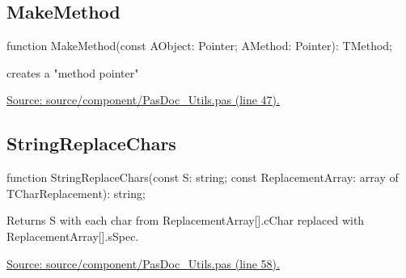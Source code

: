 \documentclass{report}
\newif\ifpdf
\begin{document}
\subsection*{MakeMethod}
\fi
\label{PasDoc_Utils-MakeMethod}
\begin{list}{}{
\setlength{\itemindent}{0cm}
\setlength{\listparindent}{0cm}
\setlength{\leftmargin}{\evensidemargin}
\addtolength{\leftmargin}{\tmplength}
\settowidth{\labelsep}{X}
\addtolength{\leftmargin}{\labelsep}
\setlength{\labelwidth}{\tmplength}
}
\item[\textbf{Declaration}\hfill]
\ifpdf
\begin{flushleft}
\fi
\begin{ttfamily}
function MakeMethod(const AObject: Pointer; AMethod: Pointer): TMethod;\end{ttfamily}

\ifpdf
\end{flushleft}
\fi

\par
\item[\textbf{Description}]
creates a "method pointer"\par
\href{https://github.com/pasdoc/pasdoc/blob/master/source/component/PasDoc_Utils.pas#L47}{Source: source/component/PasDoc{\_}Utils.pas (line 47).}

\end{list}
\ifpdf
\subsection*{\large{\textbf{StringReplaceChars}}\normalsize\hspace{1ex}\hrulefill}
\else
\subsection*{StringReplaceChars}
\fi
\label{PasDoc_Utils-StringReplaceChars}
\begin{list}{}{
\setlength{\itemindent}{0cm}
\setlength{\listparindent}{0cm}
\setlength{\leftmargin}{\evensidemargin}
\addtolength{\leftmargin}{\tmplength}
\settowidth{\labelsep}{X}
\addtolength{\leftmargin}{\labelsep}
\setlength{\labelwidth}{\tmplength}
}
\item[\textbf{Declaration}\hfill]
\ifpdf
\begin{flushleft}
\fi
\begin{ttfamily}
function StringReplaceChars(const S: string; const ReplacementArray: array of TCharReplacement): string;\end{ttfamily}

\ifpdf
\end{flushleft}
\fi

\par
\item[\textbf{Description}]
Returns S with each char from ReplacementArray[].cChar replaced with ReplacementArray[].sSpec.\par
\href{https://github.com/pasdoc/pasdoc/blob/master/source/component/PasDoc_Utils.pas#L58}{Source: source/component/PasDoc{\_}Utils.pas (line 58).}

\end{list}
\ifpdf
\end{document}
